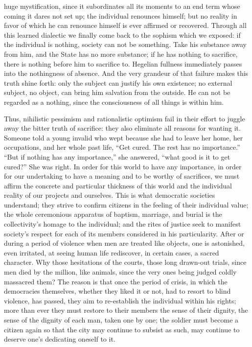 \documentclass[11pt]{article}
\begin{document}
{{huge mystification, since it subordinates all its moments to an end term whose coming it dares not set up; the individual renounces himself; but no reality in favor of which he can renounce himself is ever affirmed or recovered. Through all this learned dialectic we finally come back to the sophism which we exposed: if the individual is nothing, society can not be something. Take his substance away from him, and the State has no more substance; if he has nothing to sacrifice, there is nothing before him to sacrifice to. Hegelian fullness immediately passes into the nothingness of absence. And the very grandeur of that failure makes this truth shine forth: only the subject can justify his own existence; no external subject, no object, can bring him salvation from the outside. He can not be regarded as a nothing, since the consciousness of all things is within him.

Thus, nihilistic pessimism and rationalistic optimism fail in their effort to juggle away the bitter truth of sacrifice: they also eliminate all reasons for wanting it. Someone told a young invalid who wept because she had to leave her home, her occupations, and her whole past life, “Get cured. The rest has no importance.” “But if nothing has any importance,” she answered, “what good is it to get cured?” She was right. In order for this world to have any importance, in order for our undertaking to have a meaning and to be worthy of sacrifices, we must affirm the concrete and particular thickness of this world and the individual reality of our projects and ourselves. This is what democratic societies understand; they strive to confirm citizens in the feeling of their individual value; the whole ceremonious apparatus of baptism, marriage, and burial is the collectivity’s homage to the individual; and the rites of justice seek to manifest society’s respect for each of its members considered in his particularity. After or during a period of violence when men are treated like objects, one is astonished, even irritated, at seeing human life rediscover, in certain cases, a sacred character. Why those hesitations of the courts, those long drawn-out trials, since men died by the million, like animals, since the very ones being judged coldly massacred them? The reason is that once the period of crisis, in which the democracies themselves, whether they liked it or not, had to resort to blind violence, has passed, they aim to re-establish the individual within his rights; more than ever they must restore to their members the sense of their dignity, the sense of the dignity of each man, taken one by one; the soldier must become a citizen again so that the city may continue to subsist as such, may continue to deserve one’s dedicating oneself to it.

}}
\end{document}
